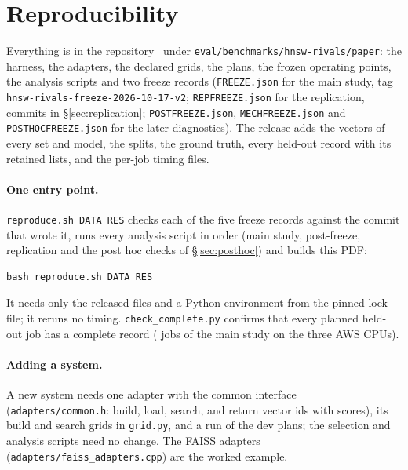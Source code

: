 \section{Reproducibility}\label{sec:repro}

Everything is in the repository~\cite{sweetsearch_repo} under \texttt{eval/benchmarks/hnsw-rivals/paper}: the harness, the
adapters, the declared grids, the plans, the frozen operating points, the analysis scripts and two freeze records
(\texttt{FREEZE.json} for the main study, tag \texttt{hnsw-rivals-freeze-2026-10-17-v2}; \texttt{REPFREEZE.json} for the
replication, commits in \S\ref{sec:replication}; \texttt{POSTFREEZE.json}, \texttt{MECHFREEZE.json} and \texttt{POSTHOCFREEZE.json}
for the later diagnostics). The release adds the vectors of every set and model, the splits, the
ground truth, every held-out record with its retained lists, and the per-job timing files.

\paragraph{One entry point.} \texttt{reproduce.sh DATA RES} checks each of the five freeze records against the commit that
wrote it, runs every analysis script in order (main study, post-freeze, replication and the post hoc checks of
\S\ref{sec:posthoc}) and builds this PDF:

\begin{small}\begin{verbatim}
bash reproduce.sh DATA RES
\end{verbatim}\end{small}

\noindent It needs only the released files and a Python environment from the pinned lock file; it reruns no
timing. \texttt{check\_complete.py} confirms that every planned held-out job has a complete record ( jobs of
the main study on the three AWS CPUs).

\paragraph{Adding a system.} A new system needs one adapter with the common interface (\texttt{adapters/common.h}:
build, load, search, and return vector ids with scores), its build and search grids in \texttt{grid.py}, and a run of
the dev plans; the selection and analysis scripts need no change. The FAISS adapters
(\texttt{adapters/faiss\_adapters.cpp}) are the worked example.


